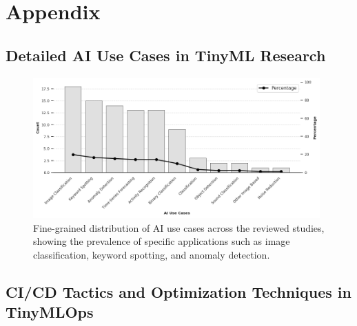 
\chapter{Appendix}

\section{Detailed AI Use Cases in TinyML Research}
\label{app:detailed-ai-use-cases}

\begin{figure}[htbp]
    \centering
    \includegraphics[width=0.98\textwidth]{figs/research_results/ai_use_case_detailed.png}
    \caption[Detailed AI Use Case Distribution]{Fine-grained distribution of AI use cases across the reviewed studies, showing the prevalence of specific applications such as image classification, keyword spotting, and anomaly detection.}
    \label{fig:detailed-ai-use-cases}
\end{figure}

\section{CI/CD Tactics and Optimization Techniques in TinyMLOps}
\label{app:cicd-optim-techniques}


